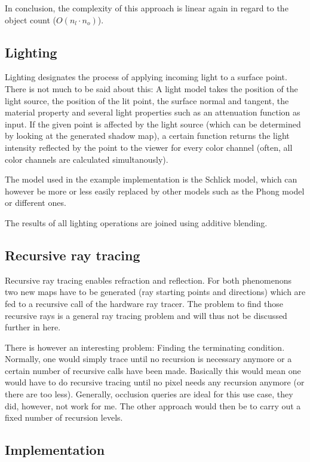 \documentclass[english,fleqn,10pt,twocolumn]{article}
\begin{document}
In conclusion, the complexity of this approach is linear again in regard to the object count ($O(n_l \cdot n_o)$).

\subsection{Lighting}

Lighting designates the process of applying incoming light to a surface point. There is not much to be said about this: A light model takes the position of the light source, the position of the lit point, the surface normal and
tangent, the material property and several light properties such as an attenuation function as input. If the given point is affected by the light source (which can be determined by looking at the generated shadow map), a certain
function returns the light intensity reflected by the point to the viewer for every color channel (often, all color channels are calculated simultanously).

The model used in the example implementation is the Schlick model\cite{SCHL93}, which can however be more or less easily replaced by other models such as the Phong model or different ones.

The results of all lighting operations are joined using additive blending.

\subsection{Recursive ray tracing}

Recursive ray tracing enables refraction and reflection. For both phenomenons two new maps have to be generated (ray starting points and directions) which are fed to a recursive call of the hardware ray tracer. The problem to find those
recursive rays is a general ray tracing problem and will thus not be discussed further in here.

There is however an interesting problem: Finding the terminating condition. Normally, one would simply trace until no recursion is necessary anymore or a certain number of recursive calls have been made. Basically this would mean
one would have to do recursive tracing until no pixel needs any recursion anymore (or there are too less). Generally, occlusion queries are ideal for this use case, they did, however, not work for me. The other approach would then be to
carry out a fixed number of recursion levels.

\subsection{Implementation}
\end{document}

